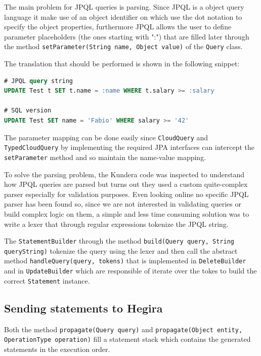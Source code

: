 \newparagraph The main problem for JPQL queries is parsing. Since JPQL is a  object query language it make use of an object identifier on which use the dot notation to specify the object properties, furthermore JPQL allows the user to define parameter placeholders (the ones starting with ":") that are filled later through the method \texttt{setParameter(String name, Object value)} of the \texttt{Query} class.

\noindent The translation that should be performed is shown in the following snippet:

\begin{lstlisting}[language=SQL, caption=JPQL to SQL translation, label=code:query-translation, numbers=none]
# JPQL query string
UPDATE Test t SET t.name = :name WHERE t.salary >= :salary

# SQL version
UPDATE Test SET name = 'Fabio' WHERE salary >= '42'
\end{lstlisting} 

\noindent The parameter mapping can be done easily since \texttt{CloudQuery} and \texttt{TypedCloudQuery} by implementing the required JPA interfaces can intercept the \texttt{setParameter} method and so maintain the name-value mapping.

\newparagraph To solve the parsing problem, the Kundera code was inspected to understand how JPQL queries are parsed but turns out they used a custom quite-complex parser especially for validation purposes. Even looking online no specific JPQL parser has been found so, since we are not interested in validating queries or build complex logic on them, a simple and less time consuming solution was to write a lexer that through regular expressions tokenize the JPQL string.

\noindent The \texttt{StatementBuilder} through the method \texttt{build(Query query, String queryString)} tokenize the query using the lexer and then call the abstract method \texttt{handleQuery(query, tokens)} that is implemented in \texttt{DeleteBuilder} and in \texttt{UpdateBuilder} which are responsible of iterate over the tokes to build the correct \texttt{Statement} instance.

\subsection{Sending statements to Hegira}
Both the method \texttt{propagate(Query query)} and \texttt{propagate(Object entity, OperationType operation)} fill a statement stack which contains the generated statements in the execution order.

